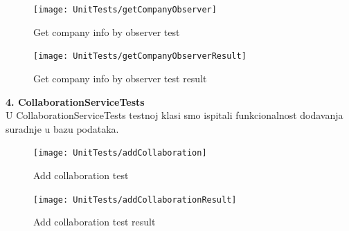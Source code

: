 			\begin{figure}[H]
				\texttt{[image: UnitTests/getCompanyObserver]}
				\centering
				\caption{Get company info by observer test}
				\label{fig:getCompanyObserver}
			\end{figure}
			\begin{figure}[H]
				\texttt{[image: UnitTests/getCompanyObserverResult]}
				\centering
				\caption{Get company info by observer test result}
				\label{fig:getCompanyObserverResult}
			\end{figure}
			
			\textbf{4. CollaborationServiceTests\\}
			{U CollaborationServiceTests testnoj klasi smo ispitali funkcionalnost dodavanja suradnje u bazu podataka.}

			\begin{figure}[H]
				\texttt{[image: UnitTests/addCollaboration]}
				\centering
				\caption{Add collaboration test}
				\label{fig:addCollaboration}
			\end{figure}
			\begin{figure}[H]
				\texttt{[image: UnitTests/addCollaborationResult]}
				\centering
				\caption{Add collaboration test result}
				\label{fig:addCollaborationResult}
			\end{figure}

			
			 
			
